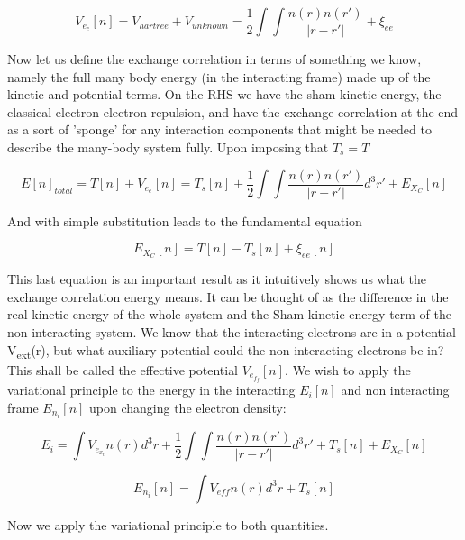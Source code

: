\documentclass[12pt]{article}
\begin{document}
\begin{equation} \label{2.6} \tag{2.6}
V_e_e[n] =V_{hartree}+V_{unknown}=\frac{1}{2}\int \int \frac{n(r)n(r')}{|r-r'|} + \xi_{ee}
\end{equation}


Now let us define the exchange correlation in terms of something we know, namely the full many body energy (in the interacting frame) made up of the kinetic and potential terms. On the RHS we have the sham kinetic energy, the classical electron electron repulsion, and have the exchange correlation at the end as a sort of 'sponge' for any interaction components that might be needed to describe the many-body system fully. Upon imposing that $T_s=T$

\begin{equation} \label{2.6} \tag{2.6}
E[n]_{total}=T[n]+V_e_e[n] = T_s[n] + \frac{1}{2}\int \int \frac{n(r)n(r')}{|r-r'|}d^3 r' + E_X_C[n]
\end{equation}

And with simple substitution leads to the fundamental equation

\begin{equation} \label{2.7} \tag{2.7}
E_X_C[n]=T[n] -T_s[n] + \xi_{ee}[n]
\end{equation}

This last equation is an important result as it intuitively shows us what the exchange correlation energy means. It can be thought of as the difference in the real kinetic energy of the whole system and the Sham kinetic energy term of the non interacting system. We know that the interacting electrons are in a potential V\textsubscript{ext}(r), but what auxiliary potential could the non-interacting electrons be in? This shall be called the effective potential $V_e_f_f[n]$. We wish to apply the variational principle to the energy in the interacting $E_i[n]$ and non interacting frame $E_n_i[n]$ upon changing the electron density:

\begin{equation} \label{2.8} \tag{2.8}
E_i=\int V_e_x_tn(r)d^3r + \frac{1}{2}\int \int \frac{n(r)n(r')}{|r-r'|}d^3 r' + T_s[n]+E_X_C[n]
\end{equation}

\begin{equation} \label{2.9} \tag{2.9}
E_n_i[n]= \int V_{eff} n(r)d^3r + T_s[n]
\end{equation}

Now we apply the variational principle to both quantities. 
\end{document}
